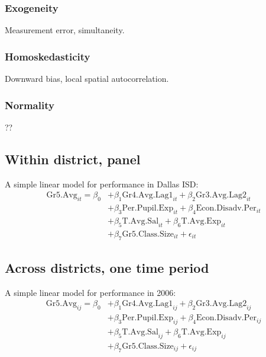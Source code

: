\documentclass[11pt]{article}
\begin{document}
\subsubsection{Exogeneity}

Measurement error, simultaneity.

\subsubsection{Homoskedasticity}

Downward bias, local spatial autocorrelation. 


\subsubsection{Normality}

??

\subsection{Within district, panel}
\label{ss:nextsub2}

A simple linear model for performance in Dallas ISD:
\begin{align*}
\mathrm{Gr5.Avg}_{it} = \beta_{0} 
    &+ \beta_{1}  \mathrm{Gr4.Avg.Lag1}_{it} 
    + \beta_{2}  \mathrm{Gr3.Avg.Lag2}_{it}    \\
    &+ \beta_{3}  \mathrm{Per.Pupil.Exp}_{it} 
    + \beta_{4}  \mathrm{Econ.Disadv.Per}_{it} \\
    &+ \beta_{5}  \mathrm{T.Avg.Sal}_{it}   
    + \beta_{6}  \mathrm{T.Avg.Exp}_{it}  \\
    &+ \beta_{7}  \mathrm{Gr5.Class.Size}_{it} + \epsilon_{it}
\end{align*}

\subsection{Across districts, one time period}
\label{ss:nextsub3}

A simple linear model for performance in 2006:
\begin{align*}
\mathrm{Gr5.Avg}_{ij} = \beta_{0} 
    &+ \beta_{1}  \mathrm{Gr4.Avg.Lag1}_{ij} 
    + \beta_{2}  \mathrm{Gr3.Avg.Lag2}_{ij}    \\
    &+ \beta_{3}  \mathrm{Per.Pupil.Exp}_{ij} 
    + \beta_{4}  \mathrm{Econ.Disadv.Per}_{ij} \\
    &+ \beta_{5}  \mathrm{T.Avg.Sal}_{ij}   
    + \beta_{6}  \mathrm{T.Avg.Exp}_{ij}  \\
    &+ \beta_{7}  \mathrm{Gr5.Class.Size}_{ij} + \epsilon_{ij}
\end{align*}
\end{document}
